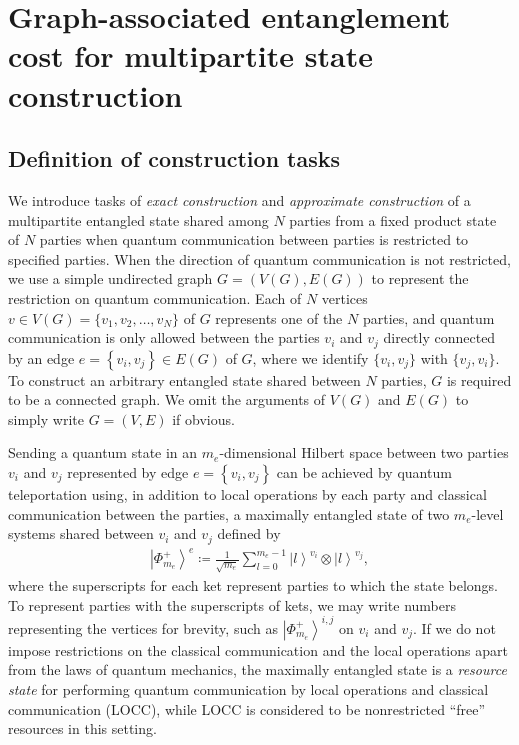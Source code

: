 \documentclass[preprintnumbers,aps,amsmath,amssymb,pra,twocolumn,showpacs,superscriptaddress,floatfix]{revtex4-1}
\def\Ket#1{\left|#1\right\rangle}
\theoremstyle{plain}
\theoremstyle{definition}
\theoremstyle{remark}
\begin{document}
\section{\label{sec:2} Graph-associated entanglement cost for multipartite state construction}
\subsection{Definition of construction tasks}
We introduce tasks of \textit{exact construction} and \textit{approximate construction} of a multipartite entangled state shared among $N$ parties from a fixed product state of $N$ parties when quantum communication between parties is restricted to specified parties.   When the direction of quantum communication is not restricted, we use a simple undirected graph $G=(V(G),E(G))$ to represent the restriction on quantum communication.  Each of $N$ vertices $v\in V(G)=\{v_1,v_2,\ldots,v_N\}$ of $G$ represents one of the $N$ parties, and quantum communication is only allowed between the parties $v_i$ and $v_j$ directly connected by an edge $e = \left\{v_i,v_j\right\} \in E(G)$ of $G$, where we identify $\{v_i, v_j\}$ with $\{v_j, v_i\}$.   To construct an arbitrary entangled state shared between $N$ parties,  $G$ is required to be a connected graph. We omit the arguments of $V(G)$ and $E(G)$ to simply write $G=(V,E)$ if obvious.

Sending a quantum state in an $m_e$-dimensional Hilbert space between two parties $v_i$ and $v_j$ represented by edge $e = \left\{v_i,v_j\right\} $ can be achieved by quantum teleportation using, in addition to local operations by each party and classical communication between the parties, a maximally entangled state of two $m_e$-level systems shared between $v_i$ and $v_j$ defined by 
\begin{align*}
    \Ket{\Phi_{m_e}^+}^e\coloneqq\frac{1}{\sqrt{m_e}}\sum_{l=0}^{m_e-1}\Ket{l}^{v_i}\otimes\Ket{l}^{v_j},
\end{align*}
where the superscripts for each ket represent parties to which the state belongs.
To represent parties with the superscripts of kets, we may write numbers representing the vertices for brevity, such as $\Ket{\Phi_{m_e}^+}^{i,j}$ on $v_i$ and $v_j$.
If we do not impose restrictions on the classical communication and the local operations apart from the laws of quantum mechanics, the maximally entangled state is a \textit{resource state} for performing quantum communication by local operations and classical communication (LOCC), while LOCC is considered to be nonrestricted ``free'' resources in this setting.
\end{document}
